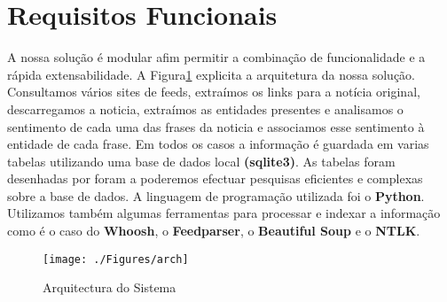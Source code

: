 \section{Requisitos Funcionais}
\hspace{15pt}A nossa solução é modular afim permitir a combinação de funcionalidade e a rápida extensabilidade. A Figura\ref{fig:arch} explicita a arquitetura da nossa solução. Consultamos vários sites de feeds, extraímos os links para a notícia original, descarregamos a noticia, extraímos as entidades presentes e analisamos o sentimento de cada uma das frases da noticia e associamos esse sentimento à entidade de cada frase. Em todos os casos a informação é guardada em varias tabelas utilizando uma base de dados local \textbf{(sqlite3)}. As tabelas foram desenhadas por foram a poderemos efectuar pesquisas eficientes e complexas sobre a base de dados. A linguagem de programação utilizada foi o \textbf{Python}. Utilizamos também algumas ferramentas para processar e indexar a informação como é o caso do \textbf{Whoosh}, o \textbf{Feedparser}, o \textbf{Beautiful Soup} e o \textbf{NTLK}.
\begin{figure}[ht!]
\centering
\texttt{[image: ./Figures/arch]}
\caption{Arquitectura do Sistema}
\label{fig:arch}
\end{figure}
